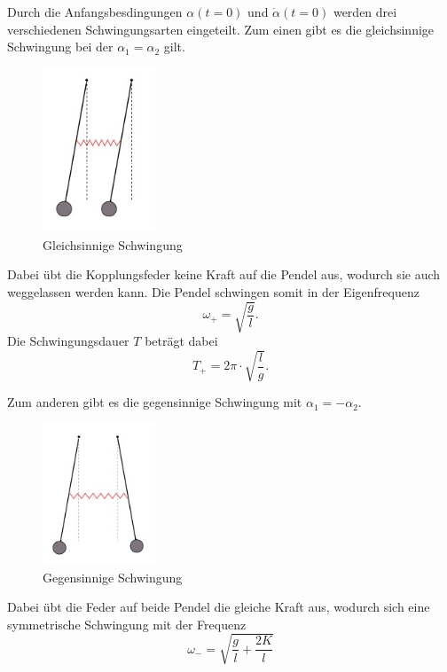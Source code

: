 Durch die Anfangsbesdingungen $\alpha (t=0)$ und $\dot{\alpha}(t=0)$ werden drei verschiedenen
Schwingungsarten eingeteilt.
Zum einen gibt es die gleichsinnige Schwingung bei der $\alpha_1 = \alpha_2$ gilt.
\begin{figure}
  \centering
  \includegraphics[width= 0.3\textwidth]{bilder/gleichsinnig.jpg}
  \caption{Gleichsinnige Schwingung\,\cite{106}}
\end{figure}
Dabei übt die Kopplungsfeder keine Kraft auf die Pendel aus, wodurch sie auch weggelassen
werden kann. Die Pendel schwingen somit in der Eigenfrequenz
\begin{equation}
  \omega_+ = \sqrt{\frac{g}{l}}.
\end{equation}
Die Schwingungsdauer $T$ beträgt dabei
\begin{equation}
  T_+ = 2 \pi \cdot \sqrt{\frac{l}{g}}.
\end{equation}
\par
Zum anderen gibt es die gegensinnige Schwingung mit $\alpha_1 = -\alpha_2$.
\begin{figure}
  \centering
  \includegraphics[width= 0.3\textwidth]{bilder/gegensinnig.jpg}
  \caption{Gegensinnige Schwingung\,\cite{106}}
\end{figure}
Dabei übt die Feder auf beide Pendel die gleiche Kraft aus, wodurch sich eine symmetrische
Schwingung mit der Frequenz
\begin{equation}
  \omega_-= \sqrt{\frac{g}{l}+\frac{2K}{l}}
\end{equation}
